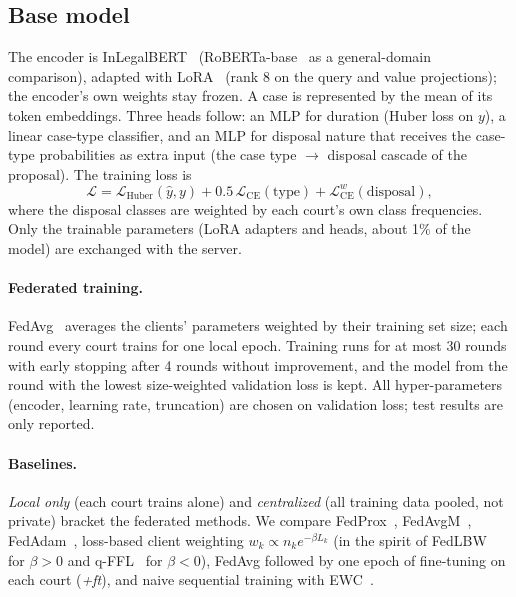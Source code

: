 \subsection{Base model}
The encoder is InLegalBERT~\cite{paul2023inlegalbert} (RoBERTa-base~\cite{liu2019roberta} as a general-domain comparison), adapted with LoRA~\cite{hu2022lora} (rank 8 on the query and value projections); the encoder's own weights stay frozen. A case is represented by the mean of its token embeddings. Three heads follow: an MLP for duration (Huber loss on $y$), a linear case-type classifier, and an MLP for disposal nature that receives the case-type probabilities as extra input (the case type $\rightarrow$ disposal cascade of the proposal). The training loss is
\begin{equation}
\mathcal{L} = \mathcal{L}_{\text{Huber}}(\hat y, y) + 0.5\,\mathcal{L}_{\text{CE}}(\text{type}) + \mathcal{L}_{\text{CE}}^{w}(\text{disposal}),
\end{equation}
where the disposal classes are weighted by each court's own class frequencies. Only the trainable parameters (LoRA adapters and heads, about 1\% of the model) are exchanged with the server.

\paragraph{Federated training.} FedAvg~\cite{mcmahan2017communication} averages the clients' parameters weighted by their training set size; each round every court trains for one local epoch. Training runs for at most 30 rounds with early stopping after 4 rounds without improvement, and the model from the round with the lowest size-weighted validation loss is kept. All hyper-parameters (encoder, learning rate, truncation) are chosen on validation loss; test results are only reported.

\paragraph{Baselines.} \emph{Local only} (each court trains alone) and \emph{centralized} (all training data pooled, not private) bracket the federated methods. We compare FedProx~\cite{li2020federated}, FedAvgM~\cite{hsu2019fedavgm}, FedAdam~\cite{reddi2021adaptive}, loss-based client weighting $w_k \propto n_k e^{-\beta L_k}$ (in the spirit of FedLBW~\cite{fedlbw2026} for $\beta>0$ and q-FFL~\cite{li2020qffl} for $\beta<0$), FedAvg followed by one epoch of fine-tuning on each court (\emph{+ft}), and naive sequential training with EWC~\cite{kirkpatrick2017ewc}.

